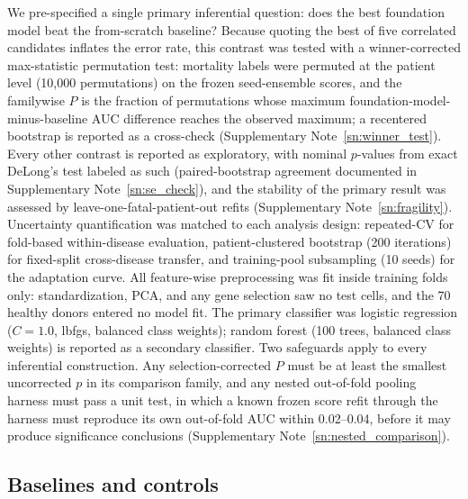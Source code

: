 We pre-specified a single primary inferential question: does the best
foundation model beat the from-scratch baseline? Because quoting the best of
five correlated candidates inflates the error rate, this contrast was tested
with a winner-corrected max-statistic permutation test: mortality labels were
permuted at the patient level (10{,}000 permutations) on the frozen
seed-ensemble scores, and the familywise $P$ is the fraction of permutations
whose maximum foundation-model-minus-baseline AUC difference reaches the
observed maximum; a recentered bootstrap is reported as a cross-check
(Supplementary Note~\ref{sn:winner_test}).
Every other contrast is reported as
exploratory, with nominal $p$-values from exact DeLong's test labeled as such
(paired-bootstrap agreement documented in Supplementary
Note~\ref{sn:se_check}), and the stability of the primary result was assessed by
leave-one-fatal-patient-out refits (Supplementary Note~\ref{sn:fragility}).
Uncertainty quantification was matched to each analysis
design: repeated-CV for fold-based within-disease evaluation, patient-clustered
bootstrap (200 iterations) for fixed-split cross-disease transfer, and
training-pool subsampling (10 seeds) for the adaptation curve.
All feature-wise preprocessing was fit inside training folds only:
standardization, PCA, and any gene selection saw no test cells, and the 70
healthy donors entered no model fit. The primary classifier was logistic
regression ($C=1.0$, lbfgs, balanced class weights); random forest (100 trees,
balanced class weights) is reported as a secondary classifier.
Two safeguards apply to every inferential construction. Any
selection-corrected $P$ must be at least the smallest uncorrected $p$ in its
comparison family, and any nested out-of-fold pooling harness must pass a
unit test, in which a known frozen score refit through the harness must
reproduce its own out-of-fold AUC within 0.02--0.04, before it may produce
significance conclusions (Supplementary Note~\ref{sn:nested_comparison}).

\subsection{Baselines and controls}
\label{ssec:methods_baselines}

